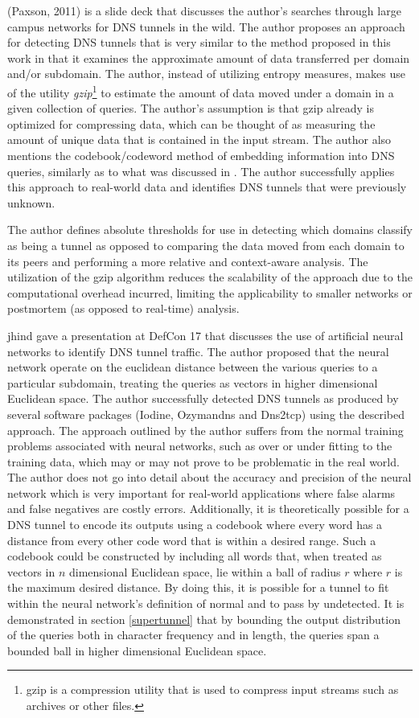 \documentclass[12pt]{report}
\theoremstyle{remark}
\theoremstyle{definition}
\theoremstyle{definition}
\theoremstyle{definition}
\begin{document}
(Paxson, 2011)\cite{Paxson2011} is a slide deck that discusses the author's
searches through large campus networks for DNS tunnels in the wild. The author
proposes an approach for detecting DNS tunnels that is very similar to the
method proposed in this work in that it examines the approximate amount of data
transferred per domain and/or subdomain. The author, instead of utilizing
entropy measures, makes use of the utility \emph{gzip}\footnote{gzip is a
compression utility that is used to compress input streams such as archives or
other files.} to estimate the amount of data moved under a domain in a given
collection of queries. The author's assumption is that gzip already is optimized
for compressing data, which can be thought of as measuring the amount of unique
data that is contained in the input stream. The author also mentions the
codebook/codeword method of embedding information into DNS queries, similarly as
to what was discussed in \cite{Butler2011}. The author successfully applies this
approach to real-world data and identifies DNS tunnels that were previously
unknown.

The author defines absolute thresholds for use in detecting which domains
classify as being a tunnel as opposed to comparing the data moved from each
domain to its peers and performing a more relative and context-aware analysis.
The utilization of the gzip algorithm reduces the scalability of the approach
due to the computational overhead incurred, limiting the applicability to
smaller networks or postmortem (as opposed to real-time) analysis.

jhind\cite{jhind2009} gave a presentation at DefCon 17 that discusses the use of
artificial neural networks to identify DNS tunnel traffic. The author proposed
that the neural network operate on the euclidean distance between the various
queries to a particular subdomain, treating the queries as vectors in higher
dimensional Euclidean space. The author successfully detected DNS tunnels as
produced by several software packages (Iodine, Ozymandns and Dns2tcp) using the
described approach. The approach outlined by the author suffers from the normal
training problems associated with neural networks, such as over or under fitting
to the training data, which may or may not prove to be problematic in the real
world. The author does not go into detail about the accuracy and precision of
the neural network which is very important for real-world applications where
false alarms and false negatives are costly errors. Additionally, it is
theoretically possible for a DNS tunnel to encode its outputs using a codebook
where every word has a distance from every other code word that is within a
desired range. Such a codebook could be constructed by including all words that,
when treated as vectors in $n$ dimensional Euclidean space, lie within a ball of
radius $r$ where $r$ is the maximum desired distance. By doing this, it is
possible for a tunnel to fit within the neural network's definition of normal
and to pass by undetected. It is demonstrated in section \ref{supertunnel} that
by bounding the output distribution of the queries both in character frequency
and in length, the queries span a bounded ball in higher dimensional Euclidean
space.
\end{document}
